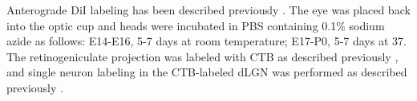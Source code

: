 Anterograde DiI labeling has been described previously \cite{plump2002slit1}.
The eye was placed back into the optic cup and heads were incubated in PBS containing 0.1\% sodium azide as follows: E14-E16, 5-7 days at
room temperature; E17-P0, 5-7 days at 37\textcelsius.
The retinogeniculate projection was labeled with CTB as described previously \cite{jaubert2005structural,rebsam2009switching}, and single neuron labeling in the CTB-labeled dLGN was performed as described previously \cite{krahe2011morphologically}.